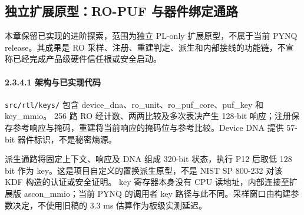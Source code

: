 
\Needspace{85pt}

\subsection{独立扩展原型：RO-PUF 与器件绑定通路}\label{ux72ecux7acbux6269ux5c55ux539fux578bro-puf-ux4e0eux5668ux4ef6ux7ed1ux5b9aux901aux8def}

本章保留已实现的进阶探索，范围为独立 PL-only 扩展原型，不属于当前 PYNQ release。其成果是 RO 采样、注册、重建判定、派生和内部接线的功能链，不宣称已经完成产品级硬件信任根或安全启动。

\Needspace{85pt}

\paragraph{2.3.4.1 架构与已实现代码}

\texttt{src/\allowbreak{}rtl/\allowbreak{}keys/\allowbreak{}} 包含 device\_dna、ro\_unit、ro\_puf\_core、puf\_key 和 key\_mmio。 256 路 RO 经计数、两两比较及多次表决产生 128-bit 响应；注册保存参考响应与掩码，重建将当前响应的掩码位与参考比较。Device DNA 提供 57-bit 器件标识，不是秘密熵源。

派生通路将固定上下文、响应及 DNA 组成 320-bit 状态，执行 P12 后取低 128 bit 作为 key。这是项目自定义的置换派生原型，不是 NIST SP 800-232 对该 KDF 构造的认证或安全证明。 key 寄存器本身没有 CPU 读地址，内部连接至扩展版 ascon\_mmio；当前 PYNQ 的调用者 key 路径与此不同。采样窗口由构建参数决定，不使用旧稿的 3.3 ms 估算作为板级实测延迟。


\Needspace{85pt}

